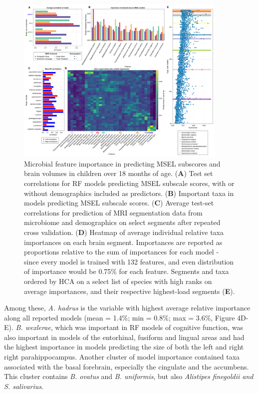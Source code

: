 \documentclass{article}
\begin{document}
\begin{figure}
    \centering
    \small
    \includegraphics[width=0.9\textwidth]{assets/Figure4.png}
    \caption{
        Microbial feature importance in predicting MSEL subscores and brain volumes in children over 18 months of age.
        (\textbf{A}) Test set correlations for RF models predicting MSEL subscale scores,
        with or without demographics included as predictors.
        (\textbf{B}) Important taxa in models predicting MSEL subscale scores.
        (\textbf{C}) Average test-set correlations for prediction of MRI segmentation
        data from microbiome and demographics on select segments after repeated
        cross validation. (\textbf{D}) Heatmap of average individual relative taxa
        importances on each brain segment. Importances are reported as
        proportions relative to the sum of importances for each model - since
        every model is trained with 132 features, and even distribution of
        importance would be 0.75\% for each feature. Segments and taxa ordered
        by HCA on a select list of species with high ranks on average importances,
        and their respective highest-load segments (\textbf{E}).
    }
    \label{fig:4}
\end{figure}

Among these, \emph{A. hadrus} is the variable with 
highest average relative importance along all reported models
(mean = 1.4\%; min = 0.8\%; max = 3.6\%, Figure 4D-E).
\emph{B. wexlerae}, which was important in RF models of cognitive function, 
was also important in models of the entorhinal, fusiform and lingual areas
and had the highest importance in models predicting the size of
both the left and right right parahippocampus.
Another cluster of model importance contained taxa associated with the
basal forebrain, especially the cingulate and the accumbens. This
cluster contains \emph{B. ovatus} and \emph{B. uniformis},
but also \emph{Alistipes finegoldii and S. salivarius}.
\end{document}
